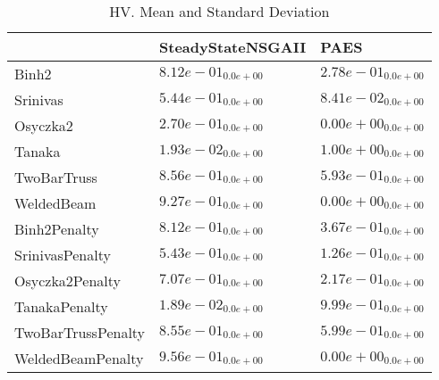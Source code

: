 \documentclass{article}
\begin{document}
\begin{table}
\caption{HV. Mean and Standard Deviation}
\label{table: HV}
\centering
\begin{scriptsize}
\begin{tabular}{lll}
\hline & SteadyStateNSGAII &  PAES\\
\hline 
Binh2 & \cellcolor{gray95}$  8.12e-01_{ 0.0e+00}$ & \cellcolor{gray25}$  2.78e-01_{ 0.0e+00}$ \\
Srinivas & \cellcolor{gray95}$  5.44e-01_{ 0.0e+00}$ & \cellcolor{gray25}$  8.41e-02_{ 0.0e+00}$ \\
Osyczka2 & \cellcolor{gray95}$  2.70e-01_{ 0.0e+00}$ & $  0.00e+00_{ 0.0e+00}$ \\
Tanaka & \cellcolor{gray25}$  1.93e-02_{ 0.0e+00}$ & \cellcolor{gray95}$  1.00e+00_{ 0.0e+00}$ \\
TwoBarTruss & \cellcolor{gray95}$  8.56e-01_{ 0.0e+00}$ & \cellcolor{gray25}$  5.93e-01_{ 0.0e+00}$ \\
WeldedBeam & \cellcolor{gray95}$  9.27e-01_{ 0.0e+00}$ & $  0.00e+00_{ 0.0e+00}$ \\
Binh2Penalty & \cellcolor{gray95}$  8.12e-01_{ 0.0e+00}$ & \cellcolor{gray25}$  3.67e-01_{ 0.0e+00}$ \\
SrinivasPenalty & \cellcolor{gray95}$  5.43e-01_{ 0.0e+00}$ & \cellcolor{gray25}$  1.26e-01_{ 0.0e+00}$ \\
Osyczka2Penalty & \cellcolor{gray95}$  7.07e-01_{ 0.0e+00}$ & \cellcolor{gray25}$  2.17e-01_{ 0.0e+00}$ \\
TanakaPenalty & \cellcolor{gray25}$  1.89e-02_{ 0.0e+00}$ & \cellcolor{gray95}$  9.99e-01_{ 0.0e+00}$ \\
TwoBarTrussPenalty & \cellcolor{gray95}$  8.55e-01_{ 0.0e+00}$ & \cellcolor{gray25}$  5.99e-01_{ 0.0e+00}$ \\
WeldedBeamPenalty & \cellcolor{gray95}$  9.56e-01_{ 0.0e+00}$ & $  0.00e+00_{ 0.0e+00}$ \\
\hline
\end{tabular}
\end{scriptsize}
\end{table}
\end{document}
